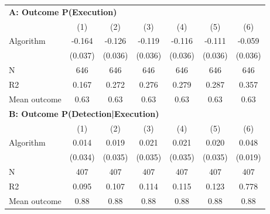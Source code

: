\begin{tabular}{lcccccc} \toprule
\multicolumn{7}{l}{\textbf{A: Outcome P(Execution)}} \\ \multicolumn{1}{l}{} & (1) & (2) & (3) & (4) & (5) & (6) \\ \midrule
Algorithm   &      -0.164\sym{***}&      -0.126\sym{***}&      -0.119\sym{***}&      -0.116\sym{***}&      -0.111\sym{***}&      -0.059         \\
            &     (0.037)         &     (0.036)         &     (0.036)         &     (0.036)         &     (0.036)         &     (0.036)         \\
\midrule
N           &         646         &         646         &         646         &         646         &         646         &         646         \\
R2          &       0.167         &       0.272         &       0.276         &       0.279         &       0.287         &       0.357         \\
Mean outcome&        0.63         &        0.63         &        0.63         &        0.63         &        0.63         &        0.63         \\

\midrule \multicolumn{7}{l}{\textbf{B: Outcome P(Detection|Execution)}} \\ \multicolumn{1}{l}{} & (1) & (2) & (3) & (4) & (5) & (6) \\ \midrule
Algorithm   &       0.014         &       0.019         &       0.021         &       0.021         &       0.020         &       0.048\sym{**} \\
            &     (0.034)         &     (0.035)         &     (0.035)         &     (0.035)         &     (0.035)         &     (0.019)         \\
\midrule
N           &         407         &         407         &         407         &         407         &         407         &         407         \\
R2          &       0.095         &       0.107         &       0.114         &       0.115         &       0.123         &       0.778         \\
Mean outcome&        0.88         &        0.88         &        0.88         &        0.88         &        0.88         &        0.88         \\


\end{tabular}

